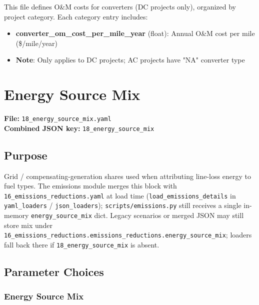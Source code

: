 \documentclass[ctcc_full_documentation.tex]{subfiles}
\begin{document}
This file defines O\&M costs for converters (DC projects only), organized by project category. Each category entry includes:
\begin{itemize}
    \item \textbf{converter\_om\_cost\_per\_mile\_year} (float): Annual O\&M cost per mile (\$/mile/year)
    \item \textbf{Note}: Only applies to DC projects; AC projects have "NA" converter type
\end{itemize}

\section{Energy Source Mix}
\label{sec:energy-source-mix}

\textbf{File:} \texttt{18\_energy\_source\_mix.yaml} \\
\textbf{Combined JSON key:} \texttt{18\_energy\_source\_mix}

\subsection{Purpose}

Grid / compensating-generation shares used when attributing line-loss energy to fuel types. The emissions module merges this block with \texttt{16\_emissions\_reductions.yaml} at load time (\texttt{load\_emissions\_details} in \texttt{yaml\_loaders} / \texttt{json\_loaders}); \texttt{scripts/emissions.py} still receives a single in-memory \texttt{energy\_source\_mix} dict. Legacy scenarios or merged JSON may still store mix under \texttt{16\_emissions\_reductions.emissions\_reductions.energy\_source\_mix}; loaders fall back there if \texttt{18\_energy\_source\_mix} is absent.

\subsection{Parameter Choices}

\subsubsection{Energy Source Mix}
\end{document}
